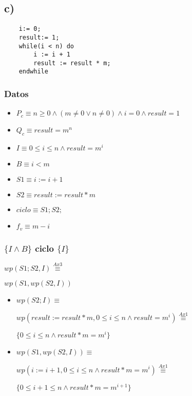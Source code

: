 \documentclass{article}
\begin{document}
\subsection*{c)}

\begin{verbatim}
    i:= 0;
    result:= 1;
    while(i < n) do
        i := i + 1
        result := result * m;
    endwhile
\end{verbatim}

\subsubsection*{Datos}
\begin{itemize}
    \item $P_{c}    \equiv n \geq 0 \wedge (m \neq 0 \vee n \neq 0) \wedge i = 0 \wedge result = 1$
    \item $Q_{c}    \equiv result = m^{n}$
    \item $I        \equiv 0 \leq i \leq n \wedge result = m^{i}$
    \item $B        \equiv i < m$
    \item $S1       \equiv i := i + 1$
    \item $S2       \equiv result := result * m$
    \item $ciclo    \equiv S1;S2;$
    \item $f_{v}    \equiv m-i$
\end{itemize}

\subsubsection*{$\{I \wedge B\}$ ciclo $\{ I \}$}

$wp(S1;S2, I) \stackrel{Ax3}{\equiv}$

$wp(S1, wp(S2, I))$

\begin{itemize}
    \item $wp(S2; I) \equiv$

    $wp(result := result * m, 0 \leq i \leq n \wedge result = m^{i}) \stackrel{Ax1}{\equiv}$

    $\{0 \leq i \leq n \wedge result * m = m^{i}\}$

    \item $wp(S1, wp(S2, I)) \equiv$

    $wp(i:= i + 1, 0 \leq i \leq n \wedge result * m = m^{i}) \stackrel{Ax1}{\equiv}$

    $\{ 0 \leq i+1 \leq n \wedge result*m = m^{i+1} \}$

\end{itemize}
\end{document}
